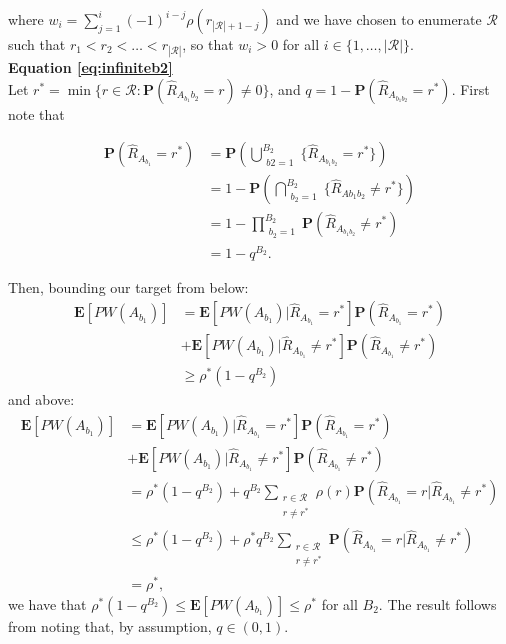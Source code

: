 \documentclass[12pt]{article}
\begin{document}
where $w_i = \sum_{j = 1}^i (-1)^{i-j}\rho(r_{|\mathcal{R}| + 1 - j})$ and we have chosen to enumerate $\mathcal{R}$ such that $r_1 < r_2 < \dots < r_{|\mathcal{R}|}$, so that $w_i>0$ for all $i  \in \{1, \dots, \mathcal{|R|}\}$. 
\bigskip \\
\noindent \textbf{Equation \ref{eq:infiniteb2}} \\
Let $r^* = \min \{r \in \mathcal{R}: \mathbf{P}(\hat{R}_{A_{b_1}{b_2}}= r ) \neq 0 \}$, and $q = 1 - \mathbf{P}(\hat{R}_{A_{b_1b_2}} = r^*)$. First note that

\begin{align*}
    \mathbf{P}(\hat{R}_{A_{b_1}} = r^*) & = \mathbf{P}(\bigcup_{\substack{b2 = 1}}^{B_2} \{ \hat{R}_{A_{b_1b_2}} = r^*\} )\\
    & = 1 - \mathbf{P}(\bigcap_{\substack{b_2 = 1}}^{B_2} \{\hat{R}_{A{b_1b_2}} \neq r^* \} ) \\
    & = 1 - \prod_{\substack{b_2 = 1}}^{B_2} \mathbf{P}(\hat{R}_{A_{b_1b_2}} \neq r^*) \\
    & = 1 - q^{B_2}.
\end{align*}

Then, bounding our target from below: 
\begin{align*}
    \mathbf{E}[PW(A_{b_1})]  & = \mathbf{E}[PW(A_{b_1})|\hat{R}_{A_{b_1}} = r^*] \mathbf{P}(\hat{R}_{A_{b_1}} = r^*) \\
    & + \mathbf{E}[PW(A_{b_1})|\hat{R}_{A_{b_1}} \neq r^*] \mathbf{P}(\hat{R}_{A_{b_1}} \neq r^*) \\
    & \geq \rho^* (1-q^{B_2})
    \end{align*}
and above:
\begin{align*}
    \mathbf{E}[PW(A_{b_1})]  & = \mathbf{E}[PW(A_{b_1})|\hat{R}_{A_{b_1}} = r^*] \mathbf{P}(\hat{R}_{A_{b_1}} = r^*) \\
    & + \mathbf{E}[PW(A_{b_1})|\hat{R}_{A_{b_1}} \neq r^*] \mathbf{P}(\hat{R}_{A_{b_1}} \neq r^*) \\
    & = \rho^*(1-q^{B_2}) + q^{B_2}\sum_{\substack{r \in \mathcal{R} \\ r \neq r^*}}\rho(r) \mathbf{P}(\hat{R}_{A_{b_1}} = r | \hat{R}_{A_{b_1}} \neq r^*) \\
    & \leq \rho^*(1-q^{B_2}) + \rho^*q^{B_2} \sum_{\substack{r \in \mathcal{R} \\ r \neq r^*}}\mathbf{P}(\hat{R}_{A_{b_1}} = r | \hat{R}_{A_{b_1}} \neq r^*) \\
    & = \rho^*,
\end{align*}
we have that $\rho^*(1- q^{B_2}) \leq \mathbf{E}[PW(A_{b_1})] \leq \rho^*$ for all $B_2$. The result follows from noting that, by assumption, $q \in (0,1)$.
    
    



\end{document}
